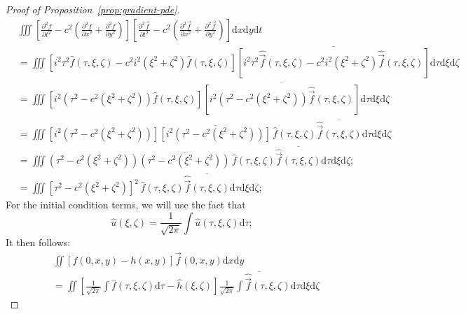 \documentclass{article}
\newcommand{\dif}{\mathrm{d}}
\begin{document}
\begin{proof}[Proof of Proposition~\ref{prop:gradient-pde}]
    {\small
    \begin{align*}
        & \iiint \left[ \frac{\partial^2 f}{\partial t^2} - c^2 \left( \frac{\partial^2 f}{\partial x^2} + \frac{\partial^2 f}{\partial y^2} \right) \right] \left[ \frac{\partial^2 \vec{f}}{\partial t^2} - c^2 \left( \frac{\partial^2 \vec{f}}{\partial x^2} + \frac{\partial^2 \vec{f}}{\partial y^2} \right) \right] \dif x \dif y \dif t
        \\ &= \iiint \left[ i^2 \tau^2 \widehat{f}(\tau, \xi, \zeta) - c^2 i^2 \left( \xi^2 + \zeta^2 \right) \widehat{f}(\tau, \xi, \zeta) \right] \overline{\left[ i^2 \tau^2 \widehat{\vec{f}}(\tau, \xi, \zeta) - c^2 i^2 \left( \xi^2 + \zeta^2 \right) \widehat{\vec{f}}(\tau, \xi, \zeta) \right]} \dif \tau \dif \xi \dif \zeta
        \\ &= \iiint \left[ i^2 \left( \tau^2 - c^2 \left( \xi^2 + \zeta^2 \right) \right) \widehat{f}(\tau, \xi, \zeta) \right] \overline{\left[ i^2 \left( \tau^2 - c^2 \left( \xi^2 + \zeta^2 \right) \right) \widehat{\vec{f}}(\tau, \xi, \zeta) \right]} \dif \tau \dif \xi \dif \zeta
        \\ &= \iiint \left[ i^2 \left( \tau^2 - c^2 \left( \xi^2 + \zeta^2 \right) \right) \right] \overline{\left[ i^2 \left( \tau^2 - c^2 \left( \xi^2 + \zeta^2 \right) \right) \right]} \, \widehat{f}(\tau, \xi, \zeta) \overline{\widehat{\vec{f}}(\tau, \xi, \zeta)} \dif \tau \dif \xi \dif \zeta
        \\ &= \iiint \left( \tau^2 - c^2 \left( \xi^2 + \zeta^2 \right) \right) \overline{\left( \tau^2 - c^2 \left( \xi^2 + \zeta^2 \right) \right)} \, \widehat{f}(\tau, \xi, \zeta) \overline{\widehat{\vec{f}}(\tau, \xi, \zeta)} \dif \tau \dif \xi \dif \zeta;
        \\ &= \iiint \left[ \tau^2 - c^2 \left( \xi^2 + \zeta^2 \right) \right]^2 \, \widehat{f}(\tau, \xi, \zeta) \overline{\widehat{\vec{f}}(\tau, \xi, \zeta)} \dif \tau \dif \xi \dif \zeta;
    \end{align*}
    }
    For the initial condition terms, we will use the fact that
    \[ \widehat{u}(\xi, \zeta) = \frac{1}{\sqrt{2\pi}} \int \widehat{u}(\tau, \xi, \zeta) \dif \tau; \]
    It then follows:
    \begin{align*}
        &\iint \left[ f(0, x, y) - h(x, y) \right] \vec{f}(0, x, y) \dif x \dif y
        \\ &= \iint \left[ \frac{1}{\sqrt{2\pi}} \int \widehat{f}(\tau, \xi, \zeta) \dif\tau - \widehat{h}(\xi, \zeta) \right] \overline{\frac{1}{\sqrt{2\pi}} \int \widehat{\vec{f}}(\tau, \xi, \zeta) \dif \tau} \dif \xi \dif \zeta

\end{align*}
\end{proof}
\end{document}
